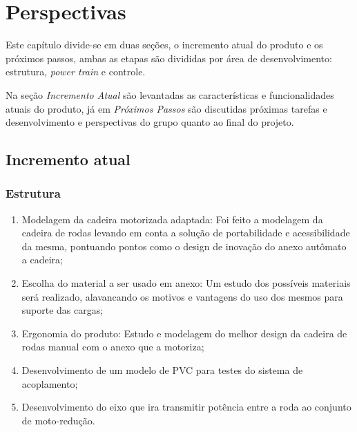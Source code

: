 \chapter[Perspectivas]{Perspectivas}

Este capítulo divide-se em duas seções, o incremento atual do produto e os próximos passos, ambas as etapas são divididas por área de desenvolvimento: estrutura, \textit{power train} e controle. 

Na seção \textit{Incremento Atual} são levantadas as características e funcionalidades atuais do produto, já em \textit{Próximos Passos} são discutidas próximas tarefas e desenvolvimento e perspectivas do grupo quanto ao final do projeto.

\section{Incremento atual}
  \subsection{Estrutura}
    \begin{enumerate}
      \item Modelagem da cadeira motorizada adaptada: Foi feito a modelagem da cadeira de rodas levando em conta a solução de portabilidade e acessibilidade da mesma, pontuando pontos como o design de inovação do anexo autômato a cadeira;
      \item Escolha do material a ser usado em anexo: Um estudo dos possíveis materiais será realizado, alavancando os motivos e vantagens do uso dos mesmos para suporte das cargas;

      \item Ergonomia do produto: Estudo e modelagem do melhor design da cadeira de rodas manual com o anexo que a motoriza;

      \item Desenvolvimento de um modelo de PVC para testes do sistema de acoplamento;

      \item Desenvolvimento do eixo que ira transmitir potência entre a roda ao conjunto de moto-redução.

    \end{enumerate}

